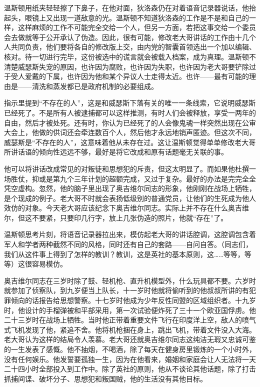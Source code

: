 温斯顿用纸夹轻轻擦了下鼻子，在他对面，狄洛森仍在对着语音记录器说话，他抬起头，眼镜上又出现一道敌意的光。温斯顿不知道狄洛森的工作是不是和自己的一样，这样麻烦的工作不可能完全交给一个人，但另一方面，若把这事交给一个委员会去做就等于公开承认了伪造。因此，很有可能，修改老大哥讲话的工作由十几个人共同负责，他们要将各自的修改版上交，由内党的智囊首领选出一个加以编辑、核对。待一切进行完毕，这份被选中的谎言就会被载入档案，成为真理。温斯顿不清楚威瑟斯失宠的原因，也许因为腐败，也许因为失职，也许因为老大哥要铲除过于受人爱戴的下属，也许因为他和某个异议人士走得太近。也许------最有可能的理由是------清洗和蒸发都已是政府机制的必要组成。

指示里提到``不存在的人''，这是和威瑟斯下落有关的唯一一条线索，它说明威瑟斯已经死了。不是所有人被逮捕都可以这样推测，有时人们会被释放，享受一两年的自由，然后才被处死。还有时，你认为已经死了的人会像鬼魂一样突然出现在公审大会上，他做的供词还会牵连数百个人，然后他才永远地销声匿迹。但这次不同，威瑟斯是``不存在的人''，这意味着他从未存在过。这让温斯顿觉得单单修改老大哥所讲话语的倾向性远远不够，最好是将它改成和原有话题毫无关联的事。

他可以将讲话改成常见的对叛徒和思想犯的斥责，但这太明显了。而如果他杜撰一场胜仗，抑或是第九个三年计划的超额完成，又过于复杂。最好的办法是完完全全凭空虚构。忽然，他的脑子里出现了奥吉维尔同志的形象，他刚刚在战场上牺牲，是个现成的例子。老大哥不时就会表扬低级别的普通党员，让他们的生死成为他人效仿的对象。今天老大哥应该纪念下奥吉维尔同志。实际上并不存在什么奥吉维尔，但这不要紧，只要印几行字，放上几张伪造的照片，他就``存在''了。

温斯顿思考片刻，将语音记录器拉出来，模仿起老大哥的讲话腔调，这腔调包含着军人和学者两种截然不同的风格，同时还有自己的套路------自问自答。（同志们，我们从这件事上得到了怎样的教训？教训，这是英社的基本原则，这\ldots\ldots 等等，等等）这很容易模仿。

奥吉维尔同志在三岁时除了鼓、轻机枪、直升机模型外，什么玩具都不要。六岁时就参加了侦察队，到九岁便当上队长，十一岁时他就将偷听到的他叔叔所讲的有犯罪倾向的话报告给思想警察。十七岁时他成为少年反性同盟的区域组织者。十九岁时，他设计的手榴弹被和平部采用，第一次试验便炸死了三十一个欧亚国俘虏。他二十三岁时在战场上牺牲。当时他正带着重要文件飞行在印度洋上空，敌人的喷气式飞机发现了他，紧追不舍。他将机枪捆在身上，跳出飞机，带着文件没入大海。老大哥认为这样的结局令人羡慕。老大哥还就奥吉维尔同志这纯洁无瑕又忠诚可鉴的一生发表了感慨。他不抽烟，不喝酒，除了每天在健身房里锻炼的一个小时外，没有任何娱乐。他发誓要孤独一生，因为在他看来，婚姻和家庭会让人无法将一天二十四小时全部投入到工作中。除了英社的原则，他从不谈论其他话题，除了打击抓捕间谍、破坏分子、思想犯和叛国贼，他的生活没有其他目标。


